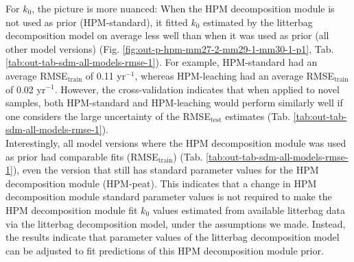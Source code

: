 \documentclass[esd, manuscript]{copernicus}
\begin{document}
For \(k_0\), the picture is more nuanced: When the HPM decomposition module is not used as prior (HPM-standard), it fitted \(k_0\) estimated by the litterbag decomposition model on average less well than when it was used as prior (all other model versions) (Fig. \ref{fig:out-p-hpm-mm27-2-mm29-1-mm30-1-p1}, Tab. \ref{tab:out-tab-sdm-all-models-rmse-1}). For example,
HPM-standard had an average RMSE\(_\text{train}\) of 0.11 yr\(^{-1}\), whereas HPM-leaching had an average RMSE\(_\text{train}\) of 0.02 yr\(^{-1}\). However, the cross-validation indicates that when applied to novel samples, both HPM-standard and HPM-leaching would perform similarly well if one considers the large uncertainty of the RMSE\(_\text{test}\) estimates (Tab. \ref{tab:out-tab-sdm-all-models-rmse-1}).\\
Interestingly, all model versions where the HPM decomposition module was used as prior had comparable fits (RMSE\(_\text{train}\)) (Tab. \ref{tab:out-tab-sdm-all-models-rmse-1}), even the version that still has standard parameter values for the HPM decomposition module (HPM-peat). This indicates that a change in HPM decomposition module standard parameter values is not required to make the HPM decomposition module fit \(k_0\) values estimated from available litterbag data via the litterbag decomposition model, under the assumptions we made. Instead, the results indicate that parameter values of the litterbag decomposition model can be adjusted to fit predictions of this HPM decomposition module prior.
\end{document}
